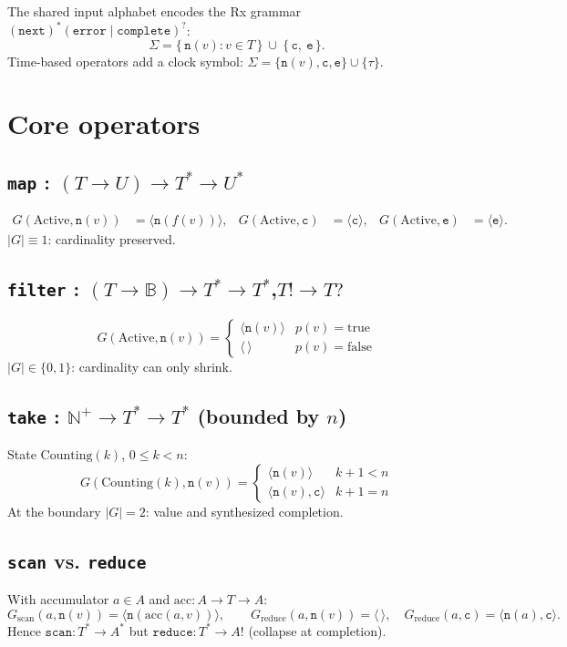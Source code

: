 \documentclass[11pt]{article}
\newcommand{\nx}[1]{\mathtt{n}(#1)}      %
\newcommand{\cmpl}{\mathtt{c}}           %
\newcommand{\err}{\mathtt{e}}            %
\newcommand{\tick}{\tau}                 %
\newcommand{\emptyout}{\langle\,\rangle} %
\newcommand{\outseq}[1]{\langle #1 \rangle}
\newcommand{\inalph}{\Sigma}
\newcommand{\outfun}{G}
\theoremstyle{definition}
\begin{document}
The shared input alphabet encodes the Rx grammar $(\texttt{next})^{*}(\texttt{error}\mid
\texttt{complete})^{?}$:
\[
  \inalph = \{\,\nx{v} : v\in T\,\}\ \cup\ \{\,\cmpl,\ \err\,\}.
\]
Time-based operators add a clock symbol: $\inalph = \{\nx{v},\cmpl,\err\}\cup\{\tick\}$.

\section{Core operators}

\subsection*{\texttt{map} : $(T\to U)\to T^{*}\to U^{*}$}
\[
\begin{aligned}
\outfun(\text{Active},\nx{v}) &= \outseq{\nx{f(v)}}, &
\outfun(\text{Active},\cmpl)  &= \outseq{\cmpl}, &
\outfun(\text{Active},\err)   &= \outseq{\err}.
\end{aligned}
\]
$|\outfun|\equiv 1$: cardinality preserved.

\subsection*{\texttt{filter} : $(T\to\mathbb{B})\to T^{*}\to T^{*}$,\quad $T!\to T?$}
\[
\outfun(\text{Active},\nx{v}) =
\begin{cases}
\outseq{\nx{v}} & p(v)=\text{true}\\[2pt]
\emptyout       & p(v)=\text{false}
\end{cases}
\]
$|\outfun|\in\{0,1\}$: cardinality can only shrink.

\subsection*{\texttt{take} : $\mathbb{N}^{+}\to T^{*}\to T^{*}$ (bounded by $n$)}
State $\mathrm{Counting}(k)$, $0\le k<n$:
\[
\outfun(\mathrm{Counting}(k),\nx{v}) =
\begin{cases}
\outseq{\nx{v}}        & k+1<n\\[2pt]
\outseq{\nx{v},\cmpl}  & k+1=n
\end{cases}
\]
At the boundary $|\outfun|=2$: value and synthesized completion.

\subsection*{\texttt{scan} vs. \texttt{reduce}}
With accumulator $a\in A$ and $\mathrm{acc}:A\to T\to A$:
\[
\outfun_{\text{scan}}(a,\nx{v}) = \outseq{\nx{\mathrm{acc}(a,v)}},
\qquad
\outfun_{\text{reduce}}(a,\nx{v}) = \emptyout,\quad
\outfun_{\text{reduce}}(a,\cmpl)  = \outseq{\nx{a},\cmpl}.
\]
Hence $\texttt{scan}:T^{*}\to A^{*}$ but $\texttt{reduce}:T^{*}\to A!$ (collapse at completion).
\end{document}
